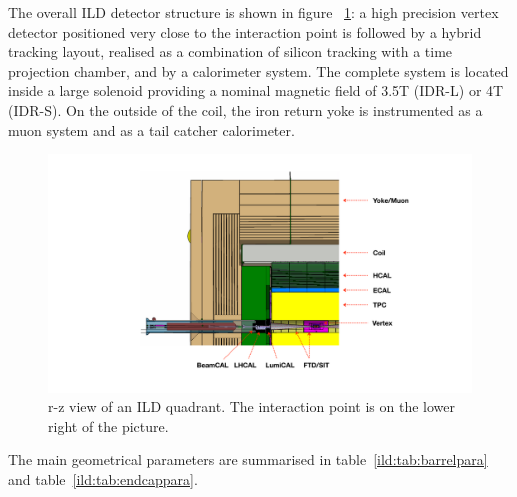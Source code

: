 The overall ILD detector structure is shown in figure ~\ref{fig:det:quad}: a high precision vertex detector positioned very close to the interaction point is followed by a hybrid tracking layout, realised as a combination of silicon tracking with a time projection chamber, and by a calorimeter system. The complete system is located inside a large solenoid providing a nominal magnetic field of 3.5T (IDR-L) or 4T (IDR-S). On the outside of the coil, the iron return yoke is instrumented as a muon system and as a tail catcher calorimeter. 
\begin{figure}[th!]
\centering
\includegraphics[width=0.85\hsize]{Detector/fig/ILD_quadrant_new_lstar.pdf}
\caption{r-z view of an ILD quadrant. The interaction point is on the lower right of the picture.}
\label{fig:det:quad}
\end{figure}
The main geometrical parameters are summarised in table~\ref{ild:tab:barrelpara} and table~\ref{ild:tab:endcappara}.

